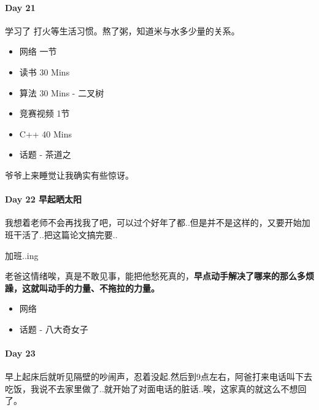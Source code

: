 \documentclass[UTF8,a4paper,8pt]{ctexart}
\begin{document}
     \paragraph{Day 21      \quad     }
	     学习了 打火等生活习惯。熬了粥，知道米与水多少量的关系。
	     \begin{itemize}
	     	\item  \makebox[0pt][l]{$\square$}\raisebox{.15ex}{\hspace{0.1em}$\checkmark$}网络  一节
	     	
	     	\item  \makebox[0pt][l]{$\square$}\raisebox{.15ex}{\hspace{0.1em}$\checkmark$}读书  30 Mins		 	
	     	\item  算法  30 Mins	- 二叉树
	     	\item  竞赛视频 1节
	     	\item  C++   40 Mins
	     	
	     	\item  \makebox[0pt][l]{$\square$}\raisebox{.15ex}{\hspace{0.1em}$\checkmark$}话题 - 茶道之
	     \end{itemize}
	     
	     爷爷上来睡觉让我确实有些惊讶。
     \paragraph{Day 22   早起晒太阳   \quad     }
	     我想着老师不会再找我了吧，可以过个好年了都..但是并不是这样的，又要开始加班干活了..把这篇论文搞完要..
	     
	     加班..ing
	     
	     老爸这情绪唉，真是不敢见事，能把他愁死真的，\textbf{早点动手解决了哪来的那么多烦躁，这就叫动手的力量、不拖拉的力量。}
	     \begin{itemize}
	     	\item  \makebox[0pt][l]{$\square$}\raisebox{.15ex}{\hspace{0.1em}$\checkmark$}网络 
	     	
	     	\item  \makebox[0pt][l]{$\square$}\raisebox{.15ex}{\hspace{0.1em}$\checkmark$}话题 - 八大奇女子
	     \end{itemize}
	     
     \paragraph{Day 23      \quad     }
	     早上起床后就听见隔壁的吵闹声，忍着没起.然后到9点左右，阿爸打来电话叫下去吃饭，我说不去家里做了..就开始了对面电话的脏话..唉，这家真的就这么不想回了。
	     
\end{document}
